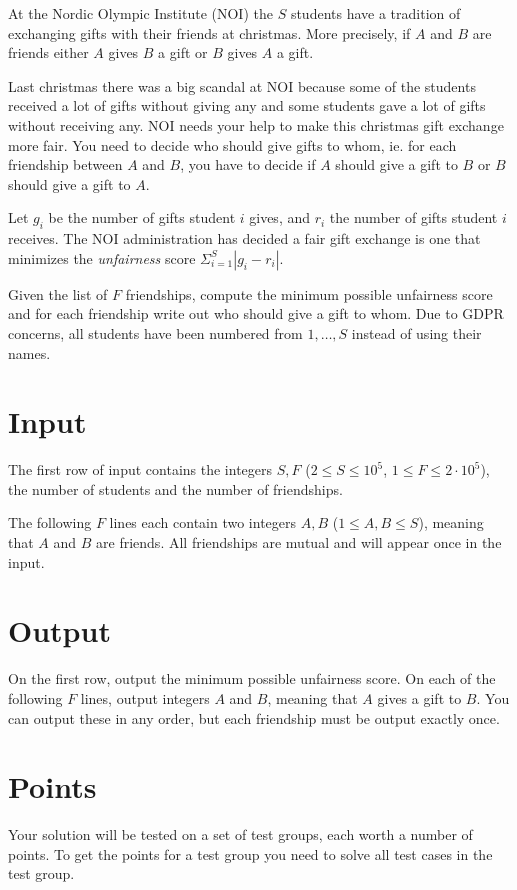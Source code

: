 \def\version{1}

At the Nordic Olympic Institute (NOI) the $S$ students have a tradition of exchanging gifts with
their friends at christmas. More precisely, if $A$ and $B$ are friends either $A$ gives $B$ a gift or
$B$ gives $A$ a gift.

Last christmas there was a big scandal at NOI because some of the students received a lot
of gifts without giving any and some students gave a lot of gifts without receiving any. NOI
needs your help to make this christmas gift exchange more fair. You need to decide who
should give gifts to whom, ie. for each friendship between $A$ and $B$, you have to decide if $A$
should give a gift to $B$ or $B$ should give a gift to $A$.

Let $g_i$ be the number of gifts student $i$ gives, and $r_i$ the number of gifts student $i$ receives.
The NOI administration has decided a fair gift exchange is one that minimizes the \textit{unfairness}
score $\Sigma_{i=1}^{S} |g_i-r_i|$.

Given the list of $F$ friendships, compute the minimum possible unfairness score and for each
friendship write out who should give a gift to whom. Due to GDPR concerns, all students
have been numbered from $1,\ldots,S$ instead of using their names.

\section*{Input}
\noindent
The first row of input contains the integers $S, F$ ($2 \leq S \leq 10^5$, $1 \leq F \leq 2 \cdot 10^5$), the number
of students and the number of friendships.

The following $F$ lines each contain two integers $A, B$ ($1 \leq A, B \leq S$), meaning that $A$ and $B$ are friends.
All friendships are mutual and will appear once in the input.

\section*{Output}
\noindent
On the first row, output the minimum possible unfairness score.
On each of the following $F$ lines, output integers $A$ and $B$, meaning that $A$ gives a gift to $B$.
You can output these in any order, but each friendship must be output exactly once.

\section*{Points}
\noindent
Your solution will be tested on a set of test groups, each worth a number of points.
To get the points for a test group you need to solve all test cases in the test group.

